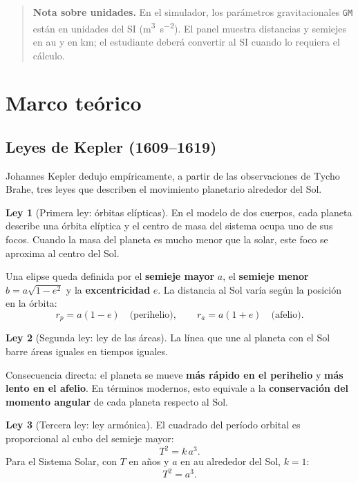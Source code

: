 \documentclass[11pt,a4paper]{article}
\newenvironment{cajaImportante}{\begin{quote}\small}{\end{quote}}
\theoremstyle{definition}
\newtheorem{ley}{Ley}
\begin{document}
\begin{cajaImportante}
\textbf{Nota sobre unidades.} En el simulador, los parámetros gravitacionales \texttt{GM} están en unidades del SI (\si{\cubic\metre\per\square\second}). El panel muestra distancias y semiejes en \si{\astronomicalunit} y en \si{\kilo\metre}; el estudiante deberá convertir al SI cuando lo requiera el cálculo.
\end{cajaImportante}

\section{Marco teórico}\label{sec:marco}

\subsection{Leyes de Kepler (1609--1619)}

Johannes Kepler dedujo empíricamente, a partir de las observaciones de Tycho Brahe, tres leyes que describen el movimiento planetario alrededor del Sol.

\begin{ley}[Primera ley: órbitas elípticas]
En el modelo de dos cuerpos, cada planeta describe una órbita elíptica y el centro de masa del sistema ocupa uno de sus focos. Cuando la masa del planeta es mucho menor que la solar, este foco se aproxima al centro del Sol.
\end{ley}

Una elipse queda definida por el \textbf{semieje mayor} $a$, el \textbf{semieje menor} $b = a\sqrt{1-e^{2}}$ y la \textbf{excentricidad} $e$. La distancia al Sol varía según la posición en la órbita:
\[
  r_p = a(1-e) \quad\text{(perihelio)}, \qquad
  r_a = a(1+e) \quad\text{(afelio)}.
\]

\begin{ley}[Segunda ley: ley de las áreas]
La línea que une al planeta con el Sol barre áreas iguales en tiempos iguales.
\end{ley}

Consecuencia directa: el planeta se mueve \textbf{más rápido en el perihelio} y \textbf{más lento en el afelio}. En términos modernos, esto equivale a la \textbf{conservación del momento angular} de cada planeta respecto al Sol.

\begin{ley}[Tercera ley: ley armónica]
El cuadrado del período orbital es proporcional al cubo del semieje mayor:
\[
  T^{2} = k\,a^{3}.
\]
Para el Sistema Solar, con $T$ en años y $a$ en \si{\astronomicalunit} alrededor del Sol, $k=1$:
\[
  T^{2} = a^{3}.
\]
\end{ley}
\end{document}
